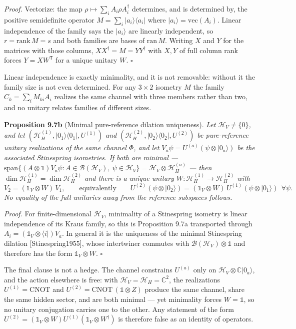 \documentclass[
]{article}
\begin{document}
\emph{Proof.} Vectorize: the map
\(\rho \mapsto \sum_i A_i \rho A_i^\dagger\) determines, and is
determined by, the positive semidefinite operator
\(M = \sum_i |a_i\rangle\langle a_i|\) where
\(|a_i\rangle = \mathrm{vec}(A_i)\). Linear independence of the family
says the \(|a_i\rangle\) are linearly independent, so
\(r = \mathrm{rank}\,M = s\) and both families are bases of
\(\mathrm{ran}\,M\). Writing \(X\) and \(Y\) for the matrices with those
columns, \(XX^\dagger = M = YY^\dagger\) with \(X, Y\) of full column
rank forces \(Y = X W^{\mathsf T}\) for a unique unitary \(W\).
\(\square\)

Linear independence is exactly minimality, and it is not removable:
without it the family size is not even determined. For any
\(3 \times 2\) isometry \(M\) the family \(C_k = \sum_i M_{ki} A_i\)
realizes the same channel with three members rather than two, and no
unitary relates families of different sizes.

\textbf{Proposition 9.7b} (Minimal pure-reference dilation uniqueness).
\emph{Let \(\mathcal{H}_V \neq \{0\}\), and let
\((\mathcal{H}_H^{(1)}, |0_1\rangle\langle 0_1|, U^{(1)})\) and
\((\mathcal{H}_H^{(2)}, |0_2\rangle\langle 0_2|, U^{(2)})\) be
pure-reference unitary realizations of the same channel \(\Phi\), and
let \(V_a \psi = U^{(a)}(\psi \otimes |0_a\rangle)\) be the associated
Stinespring isometries. If both are minimal ---
\(\overline{\mathrm{span}}\{(A \otimes \mathbb{1})V_a \psi : A \in \mathcal{B}(\mathcal{H}_V),\ \psi \in \mathcal{H}_V\} = \mathcal{H}_V \otimes \mathcal{H}_H^{(a)}\)
--- then \(\dim \mathcal{H}_H^{(1)} = \dim \mathcal{H}_H^{(2)}\) and
there is a unique unitary
\(W: \mathcal{H}_H^{(1)} \to \mathcal{H}_H^{(2)}\) with}
\[V_2 = (\mathbb{1}_V \otimes W)\, V_1, \qquad \text{equivalently} \qquad U^{(2)}(\psi \otimes |0_2\rangle) = (\mathbb{1}_V \otimes W)\, U^{(1)}(\psi \otimes |0_1\rangle) \ \ \forall \psi .\]
\emph{No equality of the full unitaries away from the reference
subspaces follows.}

\emph{Proof.} For finite-dimensional \(\mathcal{H}_V\), minimality of a
Stinespring isometry is linear independence of its Kraus family, so this
is Proposition 9.7a transported through
\(A_i = (\mathbb{1}_V \otimes \langle i|)V_a\). In general it is the
uniqueness of the minimal Stinespring dilation {[}Stinespring1955{]},
whose intertwiner commutes with
\(\mathcal{B}(\mathcal{H}_V) \otimes \mathbb{1}\) and therefore has the
form \(\mathbb{1}_V \otimes W\). \(\square\)

The final clause is not a hedge. The channel constrains \(U^{(a)}\) only
on \(\mathcal{H}_V \otimes \mathbb{C}|0_a\rangle\), and the action
elsewhere is free: with
\(\mathcal{H}_V = \mathcal{H}_H = \mathbb{C}^2\), the realizations
\(U^{(1)} = \mathrm{CNOT}\) and
\(U^{(2)} = \mathrm{CNOT}\,(\mathbb{1} \otimes Z)\) produce the same
channel, share the same hidden sector, and are both minimal --- yet
minimality forces \(W = \mathbb{1}\), so no unitary conjugation carries
one to the other. Any statement of the form
\(U^{(2)} = (\mathbb{1}_V \otimes W) U^{(1)} (\mathbb{1}_V \otimes W^\dagger)\)
is therefore false as an identity of operators.
\end{document}
